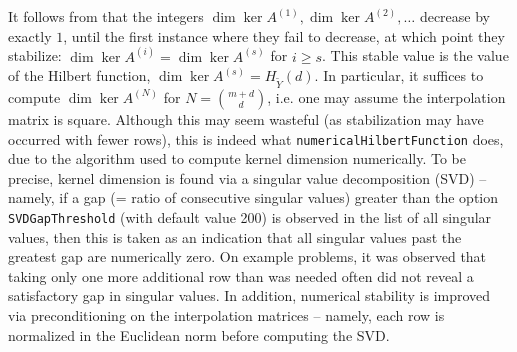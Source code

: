 \documentclass[letter]{amsart}
\theoremstyle{definition}
\begin{document}
It follows from  that the integers $\dim \ker A^{(1)}, \dim \ker A^{(2)}, \ldots$ decrease by exactly $1$, until the first instance where they fail to decrease, at which point they stabilize: $\dim \ker A^{(i)} = \dim \ker A^{(s)}$ for $i \ge s$. This stable value is the value of the Hilbert function, $\dim \ker A^{(s)} = H_{\widetilde{Y}}(d)$. In particular, it suffices to compute $\dim \ker A^{(N)}$ for $N = \binom{m+d}{d}$, i.e. one may assume the interpolation matrix is square. Although this may seem wasteful (as stabilization may have occurred with fewer rows), this is indeed what \texttt{numericalHilbertFunction} does, due to the algorithm used to compute kernel dimension numerically. To be precise, kernel dimension is found via a singular value decomposition (SVD) -- namely, if a gap (= ratio of consecutive singular values) greater than the option {\tt{SVDGapThreshold}} (with default value 200) is observed in the list of all singular values, then this is taken as an indication that all singular values past the greatest gap are numerically zero. On example problems, it was observed that taking only one more additional row than was needed often did not reveal a satisfactory gap in singular values.  In addition, numerical stability is improved via preconditioning on the interpolation matrices -- namely, each row is normalized in the Euclidean norm before computing the SVD.
\end{document}
